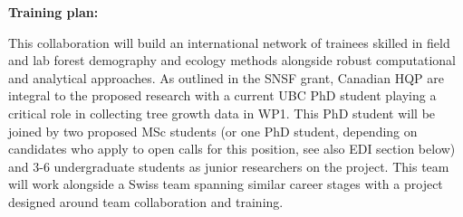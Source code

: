 \documentclass[11pt]{article}
\begin{document}
{\bf Training plan:}  %

This collaboration will build an international network of trainees skilled in field and lab forest demography and ecology methods alongside robust computational and analytical approaches. As outlined in the SNSF grant, Canadian HQP are integral to the proposed research with a current UBC PhD student playing a critical role in collecting tree growth data in WP1. This PhD student will be joined by two proposed MSc students (or one PhD student, depending on candidates who apply to open calls for this position, see also EDI section below) and 3-6 undergraduate students as junior researchers on the project. This team will work alongside a Swiss team spanning similar career stages with a project designed around team collaboration and training.
\end{document}
